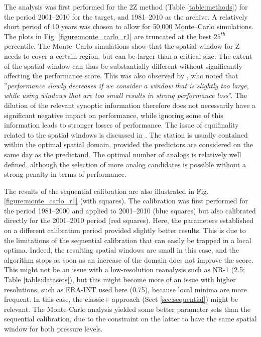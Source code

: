 \documentclass[gmdd]{copernicus}
\begin{document}
The analysis was first performed for the 2Z method (Table \ref{table:methods}) for the period 2001--2010 for the target, and 1981--2010 as the archive. A relatively short period of 10 years was chosen to allow for 50,000 Monte--Carlo simulations. The plots in Fig. \ref{figure:monte_carlo_r1} are truncated at the best $25^{th}$ percentile. The Monte--Carlo simulations show that the spatial window for Z needs to cover a certain region, but can be larger than a critical size. The extent of the spatial window can thus be substantially different without significantly affecting the performance score. This was also observed by \citet{Bontron2004}, who noted that ''\textit{performance slowly decreases if we consider a window that is slightly too large, while using windows that are too small results in strong performance loss}''. The dilution of the relevant synoptic information therefore does not necessarily have a significant negative impact on performance, while ignoring some of this information leads to stronger losses of performance. The issue of equifinality related to the spatial windows is discussed in \cite{Radanovics2013}. The station is usually contained within the optimal spatial domain, provided the predictors are considered on the same day as the predictand. The optimal number of analogs is relatively well defined, although the selection of more analog candidates is possible without a strong penalty in terms of performance.

The results of the sequential calibration are also illustrated in Fig. \ref{figure:monte_carlo_r1} (with squares). The calibration was first performed for the period 1981--2000 and applied to 2001--2010 (blue squares) but also calibrated directly for the 2001--2010 period (red squares). Here, the parameters established on a different calibration period provided slightly better results. This is due to the limitations of the sequential calibration that can easily be trapped in a local optima. Indeed, the resulting spatial windows are small in this case, and the algorithm stops as soon as an increase of the domain does not improve the score. This might not be an issue with a low-resolution reanalysis such as NR-1 (2.5\degree; Table \ref{table:datasets}), but this might become more of an issue with higher resolutions, such as ERA-INT used here (0.75\degree), because local minima are more frequent. In this case, the classic+ approach (Sect \ref{sec:sequential}) might be relevant. The Monte-Carlo analysis yielded some better parameter sets than the sequential calibration, due to the constraint on the latter to have the same spatial window for both pressure levels. 
\end{document}
